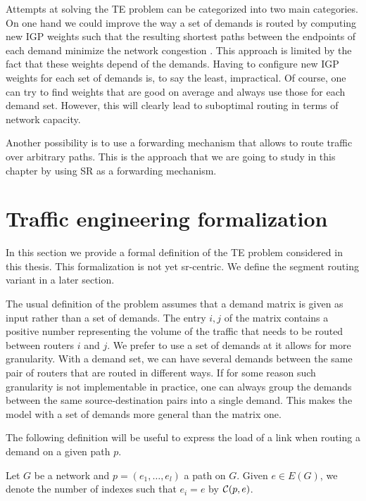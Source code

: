 Attempts at solving the TE problem can be categorized into two main categories. On one hand we could improve the way a set of demands
is routed by computing new IGP weights such that the resulting shortest paths between the endpoints of each demand minimize the 
network congestion \cite{1039866}. This approach is limited by the fact that these weights depend of the demands. Having to configure 
new IGP weights for each set of demands is, to say the least, impractical. Of course, one can try to find weights that are good on average
and always use those for each demand set. However, this will clearly lead to suboptimal routing in terms of network capacity.

Another possibility is to use a forwarding mechanism that allows to route traffic over arbitrary paths.
This is the approach that we are going to study in this chapter by using SR as a forwarding mechanism.

\section{Traffic engineering formalization}

In this section we provide a formal definition of the TE problem considered in this thesis. This formalization is not yet sr-centric. We define the segment routing variant in a later section. 

The usual definition of the problem assumes that a demand matrix is given as input rather than a set of demands. The entry $i, j$ of the
matrix contains a positive number representing the volume of the traffic that needs to be routed between routers $i$ and $j$. We prefer
to use a set of demands at it allows for more granularity. With a demand set, we can have several demands between the same pair of routers that are routed
in different ways. If for some reason such granularity is not implementable in practice, one can always group the demands between the same source-destination pairs 
into a single demand. This makes the model with a set of demands more general than the matrix one.

The following definition will be useful to express the load of a link when routing a demand on a given path $p$.

\begin{definition}
Let $G$ be a network and $p = (e_1, \ldots, e_l)$ a path on $G$. Given $e \in E(G)$, we denote the number of indexes such that
$e_i = e$ by $\mathcal{C}(p, e)$.
\end{definition}

